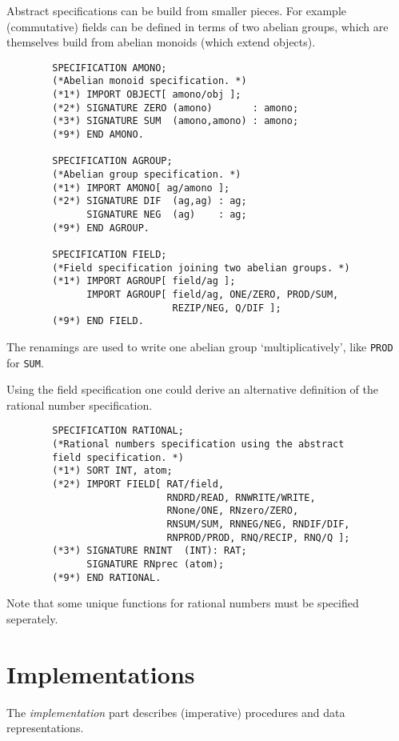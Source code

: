 Abstract specifications can be build from smaller pieces. 
For example (commutative) fields can be defined 
in terms of two abelian groups, which are themselves 
build from abelian monoids (which extend objects).  
\begin{verbatim}
        SPECIFICATION AMONO;
        (*Abelian monoid specification. *)
        (*1*) IMPORT OBJECT[ amono/obj ];
        (*2*) SIGNATURE ZERO (amono)       : amono;
        (*3*) SIGNATURE SUM  (amono,amono) : amono;
        (*9*) END AMONO.

        SPECIFICATION AGROUP;
        (*Abelian group specification. *)
        (*1*) IMPORT AMONO[ ag/amono ];
        (*2*) SIGNATURE DIF  (ag,ag) : ag;
              SIGNATURE NEG  (ag)    : ag;
        (*9*) END AGROUP.
      
        SPECIFICATION FIELD;
        (*Field specification joining two abelian groups. *)
        (*1*) IMPORT AGROUP[ field/ag ];
              IMPORT AGROUP[ field/ag, ONE/ZERO, PROD/SUM, 
                             REZIP/NEG, Q/DIF ];
        (*9*) END FIELD.
\end{verbatim}
The renamings are used to write one abelian group  
`multiplicatively', like \verb/PROD/ for \verb/SUM/.

Using the field specification one could derive an
alternative definition of the rational number specification. 
\begin{verbatim}
        SPECIFICATION RATIONAL;
        (*Rational numbers specification using the abstract 
        field specification. *)
        (*1*) SORT INT, atom;
        (*2*) IMPORT FIELD[ RAT/field,
                            RNDRD/READ, RNWRITE/WRITE,
                            RNone/ONE, RNzero/ZERO, 
                            RNSUM/SUM, RNNEG/NEG, RNDIF/DIF,
                            RNPROD/PROD, RNQ/RECIP, RNQ/Q ];
        (*3*) SIGNATURE RNINT  (INT): RAT;
              SIGNATURE RNprec (atom);
        (*9*) END RATIONAL.
\end{verbatim}
Note that some unique functions for rational numbers 
must be specified seperately.


\section{Implementations}

The {\em implementation} part describes 
(imperative) procedures and data representations.   

